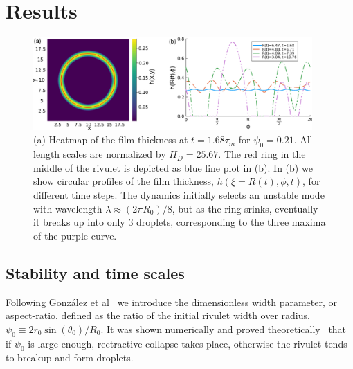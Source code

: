 \documentclass[twoside,twocolumn,9pt]{article}
\begin{document}
\section{Results}
\label{sec:dynamics}
\begin{figure}
    \centering
    \includegraphics[width=0.95\textwidth]{assets/heatcirc_2.png}
    \caption{(a) Heatmap of the film thickness at $t=1.68\tau_m$ for $\psi_0 = 0.21$. 
    All length scales are normalized by $H_D = 25.67$. 
    The red ring in the middle of the rivulet is depicted as blue line plot in (b).
    In (b) we show circular profiles of the film thickness, $h(\xi=R(t),\phi,t)$, for different time steps.
    The dynamics initially selects an unstable mode with wavelength $\lambda \approx (2 \pi R_0)/8$, 
    but as the ring srinks, eventually it breaks up into only $3$ droplets, corresponding to the three maxima of the purple curve.}
    \label{fig:ThreeDToOneD}
\end{figure}

\subsection{Stability and time scales}\label{subsec:stability}
Following Gonz\'alez et al~\cite{gonzalezStabilityLiquidRing2013} we introduce the dimensionless width
parameter, or aspect-ratio, defined as the ratio of the initial rivulet width over radius, 
$\psi_0 \equiv 2r_0 \sin(\theta_0)/R_0$. It was shown numerically and proved theoretically~\cite{gonzalezStabilityLiquidRing2013,nguyenCompetitionCollapseBreakup2012}
 that if $\psi_0$ is large enough, rectractive collapse takes place, otherwise the rivulet tends to breakup 
 and form droplets.

\end{document}
